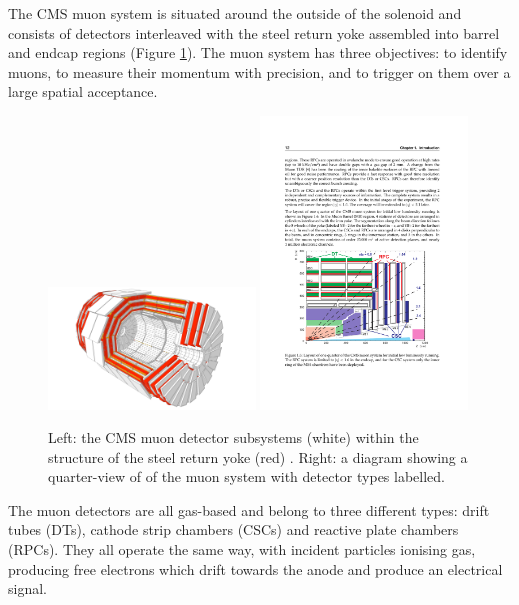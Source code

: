 The CMS muon system \cite{cmsMuon} is situated around the outside of the solenoid and consists of detectors interleaved with the steel return yoke assembled into barrel and endcap regions (Figure \ref{fig:apparatus:muon}).
The muon system has three objectives: to identify muons, to measure their momentum with precision, and to trigger on them over a large spatial acceptance. 
\begin{figure}[h!]
    \begin{center}
        \includegraphics[width=0.49\textwidth]{figures/apparatus/MUON.pdf}
        \includegraphics[width=0.49\textwidth]{figures/apparatus/muon_diagram.pdf}
    \end{center}
    \caption{Left: the CMS muon detector subsystems (white) within the structure of the steel return yoke (red) \cite{SketchupCMS}. Right: a diagram showing a quarter-view of of the muon system with detector types labelled.}
    \label{fig:apparatus:muon}
\end{figure}
The muon detectors are all gas-based and belong to three different types: drift tubes (DTs), cathode strip chambers (CSCs) and reactive plate chambers (RPCs). They all operate the same way, with incident particles ionising gas, producing free electrons which drift towards the anode and produce an electrical signal. 

